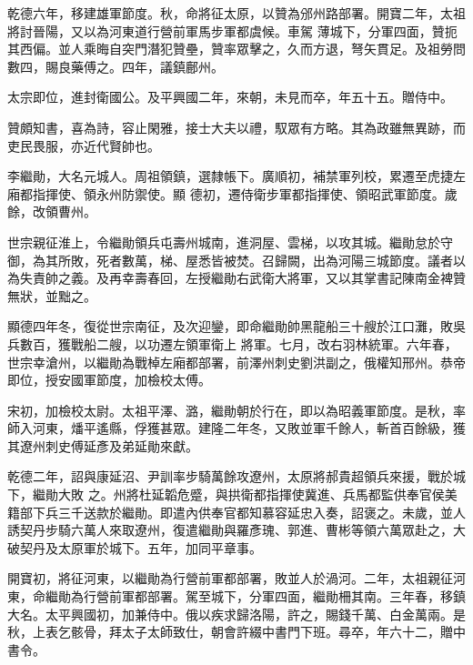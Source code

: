 \begin{pinyinscope}
 乾德六年，移建雄軍節度。秋，命將征太原，以贊為邠州路部署。開寶二年，太祖將討晉陽，又以為河東道行營前軍馬步軍都虞候。車駕
 薄城下，分軍四面，贊扼其西偏。並人乘晦自突門潛犯贊壘，贊率眾擊之，久而方退，弩矢貫足。及祖勞問數四，賜良藥傅之。四年，議鎮鄜州。



 太宗即位，進封衛國公。及平興國二年，來朝，未見而卒，年五十五。贈侍中。



 贊頗知書，喜為詩，容止閑雅，接士大夫以禮，馭眾有方略。其為政雖無異跡，而吏民畏服，亦近代賢帥也。



 李繼勛，大名元城人。周祖領鎮，選隸帳下。廣順初，補禁軍列校，累遷至虎捷左廂都指揮使、領永州防禦使。顯
 德初，遷侍衛步軍都指揮使、領昭武軍節度。歲餘，改領曹州。



 世宗親征淮上，令繼勛領兵屯壽州城南，進洞屋、雲梯，以攻其城。繼勛怠於守御，為其所敗，死者數萬，梯、屋悉皆被焚。召歸闕，出為河陽三城節度。議者以為失責帥之義。及再幸壽春回，左授繼勛右武衛大將軍，又以其掌書記陳南金裨贊無狀，並黜之。



 顯德四年冬，復從世宗南征，及次迎鑾，即命繼勛帥黑龍船三十艘於江口灘，敗吳兵數百，獲戰船二艘，以功遷左領軍衛上
 將軍。七月，改右羽林統軍。六年春，世宗幸滄州，以繼勛為戰棹左廂都部署，前澤州刺史劉洪副之，俄權知邢州。恭帝即位，授安國軍節度，加檢校太傅。



 宋初，加檢校太尉。太祖平澤、潞，繼勛朝於行在，即以為昭義軍節度。是秋，率師入河東，燔平遙縣，俘獲甚眾。建隆二年冬，又敗並軍千餘人，斬首百餘級，獲其遼州刺史傅延彥及弟延勛來獻。



 乾德二年，詔與康延沼、尹訓率步騎萬餘攻遼州，太原將郝貴超領兵來援，戰於城下，繼勛大敗
 之。州將杜延韜危蹙，與拱衛都指揮使冀進、兵馬都監供奉官侯美籍部下兵三千送款於繼勛。即遣內供奉官都知慕容延忠入奏，詔褒之。未歲，並人誘契丹步騎六萬人來取遼州，復遣繼勛與羅彥瑰、郭進、曹彬等領六萬眾赴之，大破契丹及太原軍於城下。五年，加同平章事。



 開寶初，將征河東，以繼勛為行營前軍都部署，敗並人於渦河。二年，太祖親征河東，命繼勛為行營前軍都部署。駕至城下，分軍四面，繼勛柵其南。三年春，移鎮
 大名。太平興國初，加兼侍中。俄以疾求歸洛陽，許之，賜錢千萬、白金萬兩。是秋，上表乞骸骨，拜太子太師致仕，朝會許綴中書門下班。尋卒，年六十二，贈中書令。




\end{pinyinscope}
